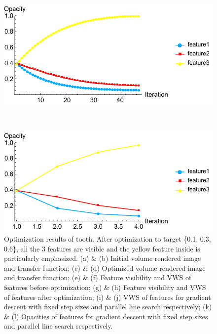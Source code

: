 \begin{figure}
	\begin{minipage}{.49\textwidth}
		\includegraphics[width=1\linewidth]{figures/tooth_naive_opacity_fixed}
		\subcaption{}
	\end{minipage}~
	\begin{minipage}{.49\textwidth}
		\includegraphics[width=1\linewidth]{figures/tooth_naive_opacity_parallelsearch}
		\subcaption{}
	\end{minipage}
	\caption[Optimization results of tooth]
	{Optimization results of tooth. After optimization to target \{0.1, 0.3, 0.6\}, all the 3 features are visible and the yellow feature inside is particularly emphasized.
		(a) \& (b) Initial volume rendered image and transfer function; (c) \& (d) Optimized volume rendered image and transfer function; (e) \& (f) Feature visibility and VWS of features before optimization; (g) \& (h) Feature visibility and VWS of features after optimization; (i) \& (j) VWS of features for gradient descent with fixed step sizes and parallel line search respectively; (k) \& (l) Opacities of features for gradient descent with fixed step sizes and parallel line search respectively.}
	\label{fig:tooth_naive_optimized}
\end{figure}

